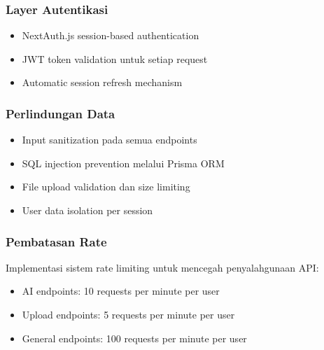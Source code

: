 \subsubsection{Layer Autentikasi}
\begin{itemize}
\item NextAuth.js session-based authentication
\item JWT token validation untuk setiap request
\item Automatic session refresh mechanism
\end{itemize}

\subsubsection{Perlindungan Data}
\begin{itemize}
\item Input sanitization pada semua endpoints
\item SQL injection prevention melalui Prisma ORM
\item File upload validation dan size limiting
\item User data isolation per session
\end{itemize}

\subsubsection{Pembatasan Rate}
Implementasi sistem rate limiting untuk mencegah penyalahgunaan API:
\begin{itemize}
\item AI endpoints: 10 requests per minute per user
\item Upload endpoints: 5 requests per minute per user
\item General endpoints: 100 requests per minute per user
\end{itemize}